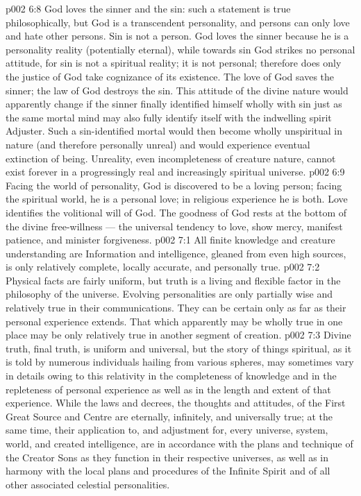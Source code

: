 \vs p002 6:8 \pc God loves the sinner and  the sin: such a statement is true philosophically, but God is a transcendent personality, and persons can only love and hate other persons. Sin is not a person. God loves the sinner because he is a personality reality (potentially eternal), while towards sin God strikes no personal attitude, for sin is not a spiritual reality; it is not personal; therefore does only the justice of God take cognizance of its existence. The love of God saves the sinner; the law of God destroys the sin. This attitude of the divine nature would apparently change if the sinner finally identified himself wholly with sin just as the same mortal mind may also fully identify itself with the indwelling spirit Adjuster. Such a sin\hyp{}identified mortal would then become wholly unspiritual in nature (and therefore personally unreal) and would experience eventual extinction of being. Unreality, even incompleteness of creature nature, cannot exist forever in a progressingly real and increasingly spiritual universe.
\vs p002 6:9 \pc Facing the world of personality, God is discovered to be a loving person; facing the spiritual world, he is a personal love; in religious experience he is both. Love identifies the volitional will of God. The goodness of God rests at the bottom of the divine free\hyp{}willness --- the universal tendency to love, show mercy, manifest patience, and minister forgiveness.
\vs p002 7:1 All finite knowledge and creature understanding are  Information and intelligence, gleaned from even high sources, is only relatively complete, locally accurate, and personally true.
\vs p002 7:2 Physical facts are fairly uniform, but truth is a living and flexible factor in the philosophy of the universe. Evolving personalities are only partially wise and relatively true in their communications. They can be certain only as far as their personal experience extends. That which apparently may be wholly true in one place may be only relatively true in another segment of creation.
\vs p002 7:3 Divine truth, final truth, is uniform and universal, but the story of things spiritual, as it is told by numerous individuals hailing from various spheres, may sometimes vary in details owing to this relativity in the completeness of knowledge and in the repleteness of personal experience as well as in the length and extent of that experience. While the laws and decrees, the thoughts and attitudes, of the First Great Source and Centre are eternally, infinitely, and universally true; at the same time, their application to, and adjustment for, every universe, system, world, and created intelligence, are in accordance with the plans and technique of the Creator Sons as they function in their respective universes, as well as in harmony with the local plans and procedures of the Infinite Spirit and of all other associated celestial personalities.
